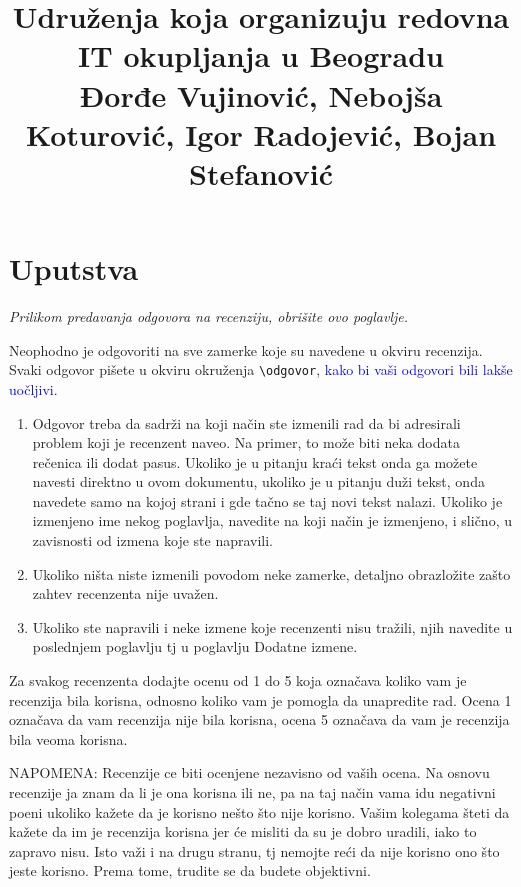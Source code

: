 \documentclass[a4paper]{report}
\newcommand{\odgovor}[1]{\textcolor{blue}{#1}}
\begin{document}
\title{Udruženja koja organizuju redovna IT okupljanja u Beogradu\\ \small{Đorđe Vujinović, Nebojša Koturović, Igor Radojević, Bojan Stefanović}}

\maketitle

\tableofcontents

\chapter{Uputstva}
\emph{Prilikom predavanja odgovora na recenziju, obrišite ovo poglavlje.}

Neophodno je odgovoriti na sve zamerke koje su navedene u okviru recenzija. Svaki odgovor pišete u okviru okruženja \verb"\odgovor", \odgovor{kako bi vaši odgovori bili lakše uočljivi.} 
\begin{enumerate}

\item Odgovor treba da sadrži na koji način ste izmenili rad da bi adresirali problem koji je recenzent naveo. Na primer, to može biti neka dodata rečenica ili dodat pasus. Ukoliko je u pitanju kraći tekst onda ga možete navesti direktno u ovom dokumentu, ukoliko je u pitanju duži tekst, onda navedete samo na kojoj strani i gde tačno se taj novi tekst nalazi. Ukoliko je izmenjeno ime nekog poglavlja, navedite na koji način je izmenjeno, i slično, u zavisnosti od izmena koje ste napravili. 

\item Ukoliko ništa niste izmenili povodom neke zamerke, detaljno obrazložite zašto zahtev recenzenta nije uvažen.

\item Ukoliko ste napravili i neke izmene koje recenzenti nisu tražili, njih navedite u poslednjem poglavlju tj u poglavlju Dodatne izmene.
\end{enumerate}

Za svakog recenzenta dodajte ocenu od 1 do 5 koja označava koliko vam je recenzija bila korisna, odnosno koliko vam je pomogla da unapredite rad. Ocena 1 označava da vam recenzija nije bila korisna, ocena 5 označava da vam je recenzija bila veoma korisna. 

NAPOMENA: Recenzije ce biti ocenjene nezavisno od vaših ocena. Na osnovu recenzije ja znam da li je ona korisna ili ne, pa na taj način vama idu negativni poeni ukoliko kažete da je korisno nešto što nije korisno. Vašim kolegama šteti da kažete da im je recenzija korisna jer će misliti da su je dobro uradili, iako to zapravo nisu. Isto važi i na drugu stranu, tj nemojte reći da nije korisno ono što jeste korisno. Prema tome, trudite se da budete objektivni. 
\end{document}
